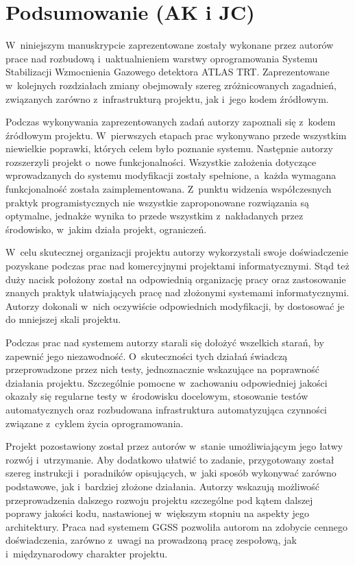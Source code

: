 \chapter{Podsumowanie (AK i JC)}
\label{cha:summary}

W~niniejszym manuskrypcie zaprezentowane zostały wykonane przez autorów prace nad rozbudową i~uaktualnieniem warstwy oprogramowania Systemu Stabilizacji Wzmocnienia Gazowego detektora ATLAS TRT. Zaprezentowane w~kolejnych rozdziałach zmiany obejmowały szereg zróżnicowanych zagadnień, związanych zarówno z~infrastrukturą projektu, jak i~jego kodem źródłowym. 

Podczas wykonywania zaprezentowanych zadań autorzy zapoznali się z~kodem źródłowym projektu. W~pierwszych etapach prac wykonywano przede wszystkim niewielkie poprawki, których celem było poznanie systemu. Następnie autorzy rozszerzyli projekt o~nowe funkcjonalności. Wszystkie założenia dotyczące wprowadzanych do systemu modyfikacji zostały spełnione, a~każda wymagana funkcjonalność została zaimplementowana. Z~punktu widzenia współczesnych praktyk programistycznych nie wszystkie zaproponowane rozwiązania są optymalne, jednakże wynika to przede wszystkim z~nakładanych przez środowisko, w~jakim działa projekt, ograniczeń.

W~celu skutecznej organizacji projektu autorzy wykorzystali swoje doświadczenie pozyskane podczas prac nad komercyjnymi projektami informatycznymi. Stąd też duży nacisk położony został na odpowiednią organizację pracy oraz zastosowanie znanych praktyk ułatwiających pracę nad złożonymi systemami informatycznymi. Autorzy dokonali w~nich oczywiście odpowiednich modyfikacji, by dostosować je do mniejszej skali projektu.

Podczas prac nad systemem autorzy starali się dołożyć wszelkich starań, by zapewnić jego niezawodność. O~skuteczności tych działań świadczą przeprowadzone przez nich testy, jednoznacznie wskazujące na poprawność działania projektu. Szczególnie pomocne w~zachowaniu odpowiedniej jakości okazały się regularne testy w~środowisku docelowym, stosowanie testów automatycznych oraz rozbudowana infrastruktura automatyzująca czynności związane z~cyklem życia oprogramowania.

Projekt pozostawiony został przez autorów w~stanie umożliwiającym jego łatwy rozwój i~utrzymanie. Aby dodatkowo ułatwić to zadanie, przygotowany został szereg instrukcji i~poradników opisujących, w~jaki sposób wykonywać zarówno podstawowe, jak i~bardziej złożone działania. Autorzy wskazują możliwość przeprowadzenia dalszego rozwoju projektu szczególne pod kątem dalszej poprawy jakości kodu, nastawionej w~większym stopniu na aspekty jego architektury. Praca nad systemem GGSS pozwoliła autorom na zdobycie cennego doświadczenia, zarówno z~uwagi na prowadzoną pracę zespołową, jak i~międzynarodowy charakter projektu.
